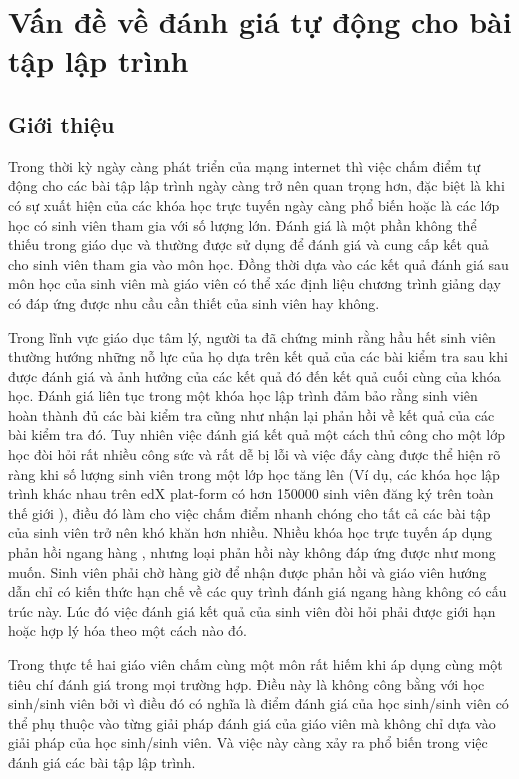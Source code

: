 \documentclass[12pt,a4paper]{report}
\begin{document}
\chapter{Vấn đề về đánh giá tự động cho bài tập lập trình}

\section{Giới thiệu}
Trong thời kỳ ngày càng phát triển của mạng internet thì việc chấm điểm tự động cho các bài tập lập trình ngày càng trở nên quan trọng hơn, đặc biệt là khi có sự xuất hiện của các khóa học trực tuyến ngày càng phổ biến hoặc là các lớp học có sinh viên tham gia với số lượng lớn. Đánh giá là một phần không thể thiếu trong giáo dục và thường được sử dụng để đánh giá và cung cấp kết quả cho sinh viên tham gia vào môn học. Đồng thời dựa vào các kết quả đánh giá sau môn học của sinh viên mà giáo viên có thể xác định liệu chương trình giảng dạy có đáp ứng được nhu cầu cần thiết của sinh viên hay không.

\indent Trong lĩnh vực giáo dục tâm lý, người ta đã chứng minh rằng hầu hết sinh viên thường hướng những nỗ lực của họ dựa trên kết quả của các bài kiểm tra sau khi được đánh giá và ảnh hưởng của các kết quả đó đến kết quả cuối cùng của khóa học. Đánh giá liên tục trong một khóa học lập trình đảm bảo rằng sinh viên hoàn thành đủ các bài kiểm tra cũng như nhận lại phản hồi về kết quả của các bài kiểm tra đó. Tuy nhiên việc đánh giá kết quả một cách thủ công cho một lớp học đòi hỏi rất nhiều công sức và rất dễ bị lỗi và việc đấy càng được thể hiện rõ ràng khi số lượng sinh viên trong một lớp học tăng lên (Ví dụ, các khóa học lập trình khác nhau trên edX plat-form có hơn 150000 sinh viên đăng ký trên toàn thế giới \cite{liu2019automatic}), điều đó làm cho việc chấm điểm nhanh chóng cho tất cả các bài tập của sinh viên trở nên khó khăn hơn nhiều. Nhiều khóa học trực tuyến áp dụng phản hồi ngang hàng \cite{weld2012personalized}, nhưng loại phản hồi này không đáp ứng được như mong muốn. Sinh viên phải chờ hàng giờ để nhận được phản hồi và giáo viên hướng dẫn chỉ có kiến thức hạn chế về các quy trình đánh giá ngang hàng không có cấu trúc này. Lúc đó việc đánh giá kết quả của sinh viên đòi hỏi phải được giới hạn hoặc hợp lý hóa theo một cách nào đó.

\indent Trong thực tế hai giáo viên chấm cùng một môn rất hiếm khi áp dụng cùng một tiêu chí đánh giá trong mọi trường hợp. Điều này là không công bằng với học sinh/sinh viên bởi vì điều đó có nghĩa là điểm đánh giá của học sinh/sinh viên có thể phụ thuộc vào từng giải pháp đánh giá của giáo viên mà không chỉ dựa vào giải pháp của học sinh/sinh viên. Và việc này càng xảy ra phổ biến trong việc đánh giá các bài tập lập trình.
\end{document}
